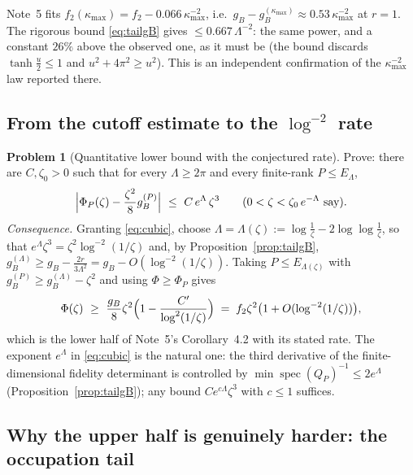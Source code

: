 \documentclass[11pt]{article}
\theoremstyle{definition}\newtheorem{problem}[theorem]{Problem}
\begin{document}
\begin{remark}
Note~5 fits \(f_2(\kappa_{\max})=f_2-0.066\,\kappa_{\max}^{-2}\), i.e.\
\(g_B-g_B^{(\kappa_{\max})}\approx0.53\,\kappa_{\max}^{-2}\) at \(r=1\).  The rigorous bound
\eqref{eq:tailgB} gives \(\le0.667\,\Lambda^{-2}\): the same power, and a constant \(26\%\) above the
observed one, as it must be (the bound discards \(\tanh\frac u2\le1\) and
\(u^2+4\pi^2\ge u^2\)).  This is an independent confirmation of the \(\kappa_{\max}^{-2}\) law
reported there.
\end{remark}

\subsection{From the cutoff estimate to the \texorpdfstring{\(\log^{-2}\)}{log^-2} rate}

\begin{problem}[Quantitative lower bound with the conjectured rate]\label{prob:rate}
Prove: there are \(C,\zeta_0>0\) such that for every \(\Lambda\ge2\pi\) and every finite-rank
\(P\le E_\Lambda\),
\begin{equation}\label{eq:cubic}
 \Bigl|\Phi_P(\zeta)-\frac{\zeta^2}{8}g_B^{(P)}\Bigr|\ \le\ C\,e^{\Lambda}\,\zeta^{3}
 \qquad(0<\zeta<\zeta_0\,e^{-\Lambda}\ \text{say}).
\end{equation}
\emph{Consequence.}  Granting \eqref{eq:cubic}, choose \(\Lambda=\Lambda(\zeta):=
\log\frac1\zeta-2\log\log\frac1\zeta\), so that \(e^{\Lambda}\zeta^3=\zeta^2\log^{-2}(1/\zeta)\) and,
by Proposition~\ref{prop:tailgB}, \(g_B^{(\Lambda)}\ge g_B-\frac{2r}{3\Lambda^2}
=g_B-O(\log^{-2}(1/\zeta))\).  Taking \(P\le E_{\Lambda(\zeta)}\) with
\(g_B^{(P)}\ge g_B^{(\Lambda)}-\zeta^2\) and using \(\Phi\ge\Phi_P\) gives
\begin{equation}\label{eq:rate}
 \Phi(\zeta)\ \ge\ \frac{g_B}{8}\zeta^2\Bigl(1-\frac{C'}{\log^2(1/\zeta)}\Bigr)
 \;=\;f_2\zeta^2\bigl(1+O(\log^{-2}(1/\zeta))\bigr),
\end{equation}
which is the lower half of Note~5's Corollary~4.2 with its stated rate.  The exponent \(e^\Lambda\)
in \eqref{eq:cubic} is the natural one: the third derivative of the finite-dimensional fidelity
determinant is controlled by \(\min\operatorname{spec}(Q_P)^{-1}\le2e^{\Lambda}\)
(Proposition~\ref{prop:tailgB}); any bound \(Ce^{c\Lambda}\zeta^3\) with \(c\le1\) suffices.
\end{problem}

\subsection{Why the upper half is genuinely harder: the occupation tail}
\end{document}
